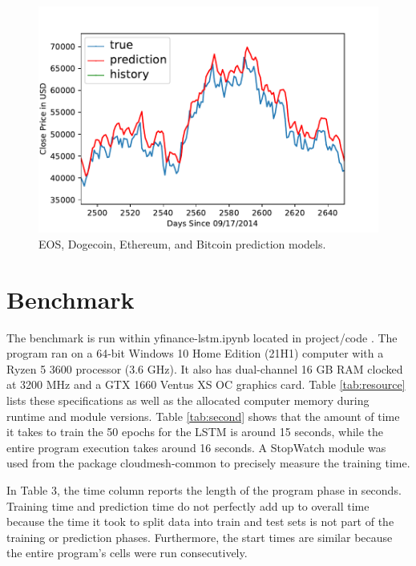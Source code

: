 \begin{figure}[p]
\begin{minipage}{.4\textwidth}
\end{minipage}
\ \
\begin{minipage}{.4\textwidth}
\includegraphics[width=1.0\textwidth]{images/BTC-USD-prediction-model-zoomed.pdf}
\end{minipage}

\caption{EOS, Dogecoin, Ethereum, and Bitcoin prediction models.}
\label{fig:other}
\end{figure}


\section{Benchmark}

The benchmark is run within yfinance-lstm.ipynb located in project/code \cite{c13}. The program ran on a 64-bit Windows 10 Home Edition (21H1) computer with a Ryzen 5 3600 processor (3.6 GHz). It also has dual-channel 16 GB RAM clocked at 3200 MHz and a GTX 1660 Ventus XS OC graphics card. Table \ref{tab:resource} lists these specifications as well as the allocated computer memory during runtime and module versions. Table \ref{tab:second} shows that the amount of time it takes to train the 50 epochs for the LSTM is around 15 seconds, while the entire program execution takes around 16 seconds. A StopWatch module was used from the package cloudmesh-common \cite{c10} to precisely measure the training time.

In Table 3, the time column reports the length of the program phase in seconds. Training time and prediction time do not perfectly add up to overall time because the time it took to split data into train and test sets is not part of the training or prediction phases. Furthermore, the start times are similar because the entire program's cells were run consecutively.
 
